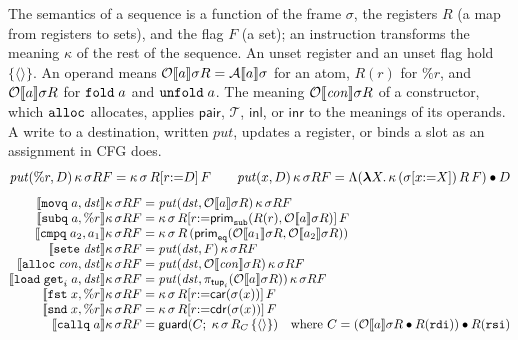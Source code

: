 The semantics of a sequence is a function of the frame $\sigma$, the
registers $R$ (a map from registers to sets), and the flag $F$ (a set);
an instruction transforms the meaning $\kappa$ of the rest of the
sequence. An unset register and an unset flag hold $\{\langle\rangle\}$.
An operand means $\mathcal{O}\llbracket a \rrbracket\sigma R = \mathcal{A}\llbracket a \rrbracket\sigma$
for an atom, $R(r)$ for $\%r$, and $\mathcal{O}\llbracket a \rrbracket\sigma R$ for
$\mathtt{fold}\;a$ and $\mathtt{unfold}\;a$. The meaning
$\mathcal{O}\llbracket \mathit{con} \rrbracket\sigma R$ of a constructor, which
$\mathtt{alloc}$ allocates, applies $\mathsf{pair}$, $\mathcal{T}$,
$\mathsf{inl}$, or $\mathsf{inr}$ to the meanings of its operands. A write to a destination, written
$\mathit{put}$, updates a register, or binds a slot as an assignment in
CFG does.
{\small\figdefs
{}
\[
  \mathit{put}(\%r, D)\,\kappa\,\sigma R F = \kappa\,\sigma\,R[r{:=}D]\,F
  \qquad
  \mathit{put}(x, D)\,\kappa\,\sigma R F =
    \Lambda(\boldsymbol{\lambda} X.\, \kappa\,(\sigma[x{:=}X])\,R\,F) \mathbin{\bullet} D
\]
}
{\small\figdefs
{}
\[
\begin{array}{@{}r@{\;}c@{\;}l@{}}
  \den{\kw{movq}\; a, \mathit{dst}}\kappa\,\sigma R F & = & \mathit{put}(\mathit{dst}, \mathcal{O}\den{a}\sigma R)\,\kappa\,\sigma R F\\
  \den{\kw{subq}\; a, \%r}\kappa\,\sigma R F & = &
    \kappa\,\sigma\,R[r{:=}\mathsf{prim}_{\kw{sub}}(R(r), \mathcal{O}\den{a}\sigma R)]\,F\\
  \den{\kw{cmpq}\; a_2, a_1}\kappa\,\sigma R F & = &
    \kappa\,\sigma\,R\,(\mathsf{prim}_{\kw{eq}}(\mathcal{O}\den{a_1}\sigma R, \mathcal{O}\den{a_2}\sigma R))\\
  \den{\kw{sete}\; \mathit{dst}}\kappa\,\sigma R F & = & \mathit{put}(\mathit{dst}, F)\,\kappa\,\sigma R F\\
  \den{\kw{alloc}\; \mathit{con}, \mathit{dst}}\kappa\,\sigma R F & = & \mathit{put}(\mathit{dst}, \mathcal{O}\den{\mathit{con}}\sigma R)\,\kappa\,\sigma R F\\
  \den{\kw{load}\; \kw{get}_i\; a, \mathit{dst}}\kappa\,\sigma R F & = &
    \mathit{put}(\mathit{dst}, \pi_{\mathsf{tup}_i}(\mathcal{O}\den{a}\sigma R))\,\kappa\,\sigma R F\\
  \den{\kw{fst}\; x, \%r}\kappa\,\sigma R F & = & \kappa\,\sigma\,R[r{:=}\car(\sigma(x))]\,F\\
  \den{\kw{snd}\; x, \%r}\kappa\,\sigma R F & = & \kappa\,\sigma\,R[r{:=}\cdr(\sigma(x))]\,F\\
  \den{\kw{callq}\; a}\kappa\,\sigma R F & = &
    \mathsf{guard}(C;\; \kappa\,\sigma\,R_C\,\{\langle\rangle\})
    \quad\text{where } C = (\mathcal{O}\den{a}\sigma R \app R(\kw{rdi})) \app R(\kw{rsi})
\end{array}
\]
}
